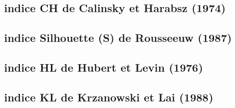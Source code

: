 \subsection{indice CH de Calinsky et Harabsz
(1974)}\label{indice-ch-de-calinsky-et-harabsz-1974}

\subsection{indice Silhouette (S) de Rousseeuw
(1987)}\label{indice-silhouette-s-de-rousseeuw-1987}

\subsection{indice HL de Hubert et Levin
(1976)}\label{indice-hl-de-hubert-et-levin-1976}

\subsection{indice KL de Krzanowski et Lai
(1988)}\label{indice-kl-de-krzanowski-et-lai-1988}
